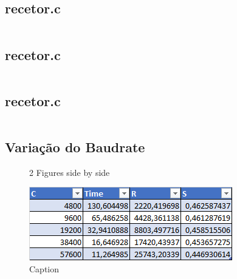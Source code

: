 \documentclass{article}
\begin{document}
\subsection{recetor.c}

\begin{lstlisting}[style=CStyle]

\end{lstlisting}

\subsection{recetor.c}

\begin{lstlisting}[style=CStyle]

\end{lstlisting}

\subsection{recetor.c}

\begin{lstlisting}[style=CStyle]

\end{lstlisting}

 
\subsection{Variação do Baudrate}

\begin{figure}%
	\centering
	\qquad
    \caption{2 Figures side by side}%
    \label{fig:example}%
\end{figure}

\begin{figure}[h]
	\includegraphics[width=\textwidth]{tabelaBaudrate.png}
	\caption{Caption}
\end{figure}
\end{document}
